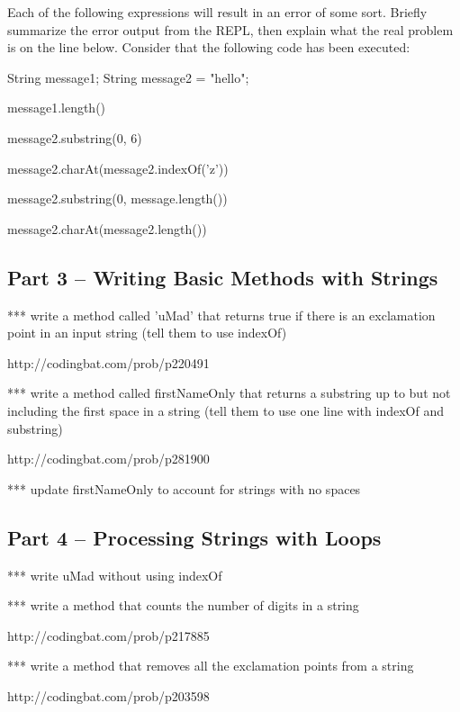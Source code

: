 \begin{eval}
Each of the following expressions will result in an error of some sort. Briefly summarize the error output from the REPL, then  explain what the real problem is on the line below. Consider that the following code has been executed:

\begin{code}
String message1;
String message2 = "hello";
\end{code}

\begin{sevalenum}
\item message1.length()
\evallinetwo
\item message2.substring(0, 6)
\evallinetwo
\item message2.charAt(message2.indexOf('z'))
\evallinetwo
\item message2.substring(0, message.length())
\evallinetwo
\item message2.charAt(message2.length())
\evallinetwo
\end{sevalenum}
\end{eval}


\initialbox

\subsection{Part 3 -- Writing Basic Methods with Strings}

*** write a method called 'uMad' that returns true if there is an exclamation point in an input string (tell them to use indexOf)

http://codingbat.com/prob/p220491

*** write a method called firstNameOnly that returns a substring up to but not including the first space in a string (tell them to use one line with indexOf and substring)

http://codingbat.com/prob/p281900

*** update firstNameOnly to account for strings with no spaces

\initialbox


\subsection{Part 4 -- Processing Strings with Loops}

*** write uMad without using indexOf

*** write a method that counts the number of digits in a string

http://codingbat.com/prob/p217885

*** write a method that removes all the exclamation points from a string

http://codingbat.com/prob/p203598

\initialbox

